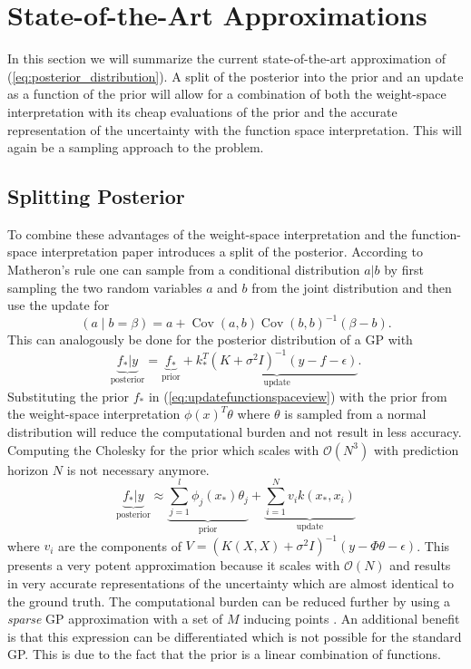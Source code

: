 \section{State-of-the-Art Approximations}
    In this section we will summarize the current state-of-the-art approximation of (\ref{eq:posterior_distribution}). A split of the posterior into the prior and an update as a function of the prior will allow for a combination of both the weight-space interpretation with its cheap evaluations of the prior and the accurate representation of the uncertainty with the function space interpretation. This will again be a sampling approach to the problem.
\subsection{Splitting Posterior}
    To combine these advantages of the weight-space interpretation and the function-space interpretation paper \cite{Paper5:PriorPosteriorSplit} introduces a split of the posterior. According to Matheron's rule one can sample from a conditional distribution $a|b$ by first sampling the two random variables $a$ and $b$ from the joint distribution and then use the update for
    $$
    ({a} \mid {b}={\beta}) ={a}+\operatorname{Cov}({a}, {b}) \operatorname{Cov}({b}, {b})^{-1}({\beta}-{b}).
    $$
    This can analogously be done for the posterior distribution of a GP with
    \begin{equation}
        \scriptstyle
        \label{eq:updatefunctionspaceview}
        \underbrace{f_* | y}_{\text {posterior}}
        =
        \underbrace{f_*}_{\text {prior}}
        +
        \underbrace{k_*^T(K+\sigma ^2I)^{-1}(y-f-\epsilon)}_{\text {update}}.
    \end{equation}
    Substituting the prior $f_*$ in (\ref{eq:updatefunctionspaceview}) with the prior from the weight-space interpretation $\phi(x)^T\theta$ where $\theta$ is sampled from a normal distribution will reduce the computational burden and not result in less accuracy. Computing the Cholesky for the prior which scales with $\mathcal O (N^3)$ with prediction horizon $N$ is not necessary anymore.
     \begin{equation}
     \label{eq:GPPosteriorSplit}
        \underbrace{f_* | y}_{\text {posterior}}
        \approx
        \underbrace{\sum_{j=1}^{l}\phi_j(x_*)\theta_j }_{\text {prior}}
        +
        \underbrace{\sum_{i=1}^{N}v_i k(x_*,x_i)}_{\text {update}}
    \end{equation}
    where $v_i$ are the components of $V = (K(X,X)+\sigma^2I)^{-1}(y-\Phi \theta -\epsilon)$. This presents a very potent approximation because it scales with $\mathcal O (N)$ and results in very accurate representations of the uncertainty which are almost identical to the ground truth. The computational burden can be reduced further by using a \textit{sparse} GP approximation with a set of $M$ inducing points \cite{Paper5:PriorPosteriorSplit}. An additional benefit is that this expression can be differentiated which is not possible for the standard GP. This is due to the fact that the prior is a linear combination of functions.